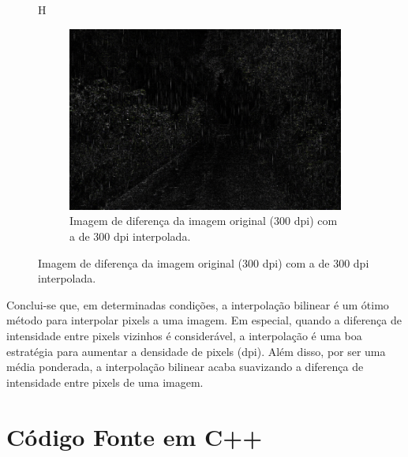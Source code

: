 \documentclass{article}
\begin{document}
\begin{figure}{H}
\begin{subfigure}[b]{0.3\textwidth}
    \end{subfigure}%
    \hfill
    \begin{subfigure}[b]{0.3\textwidth}
        \includegraphics[width=\textwidth]{imgs/dif3.2.png}
        \caption{Imagem de diferença da imagem original (300 dpi) com a de 300 dpi interpolada.}
    \end{subfigure}%
\end{figure}
\vbox{} Conclui-se que, em determinadas condições, a interpolação bilinear é um ótimo método para interpolar pixels a uma imagem. Em especial, quando a diferença de intensidade entre pixels vizinhos é considerável, a interpolação é uma boa estratégia para aumentar a densidade de pixels (dpi). Além disso, por ser uma média ponderada, a interpolação bilinear acaba suavizando a diferença de intensidade entre pixels de uma imagem.
\section{Código Fonte em C++}


\end{document}
